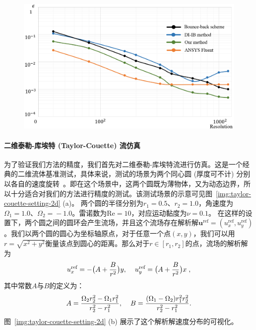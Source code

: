 \begin{figure}[!tb]
  \centering
    \includegraphics[width=0.94\columnwidth]{figures/taylor-couette-error-compare.png}
  \label{img:taylor-couette-error-compare}
\end{figure}

\paragraph{二维泰勒-库埃特 (Taylor-Couette) 流仿真}
为了验证我们方法的精度，我们首先对二维泰勒-库埃特流进行仿真。这是一个经典的二维流体基准测试，具体来说，测试的场景为两个同心圆 (厚度可不计) 分别以各自的速度旋转~\citep{xu2006immersed}。即在这个场景中，这两个圆既为薄物体，又为动态边界，所以十分适合对我们的方法进行精度的测试。该测试场景的示意可见图~\ref{img:taylor-couette-setting-2d} (a)。
两个圆的半径分别为$r_1 \!=\! 0.5$、$r_2 \!=\! 1.0$，角速度为$\Omega_1 \!=\! 1.0$、$\Omega_2 \!=\! -1.0$。雷诺数为$\text{Re} \!=\! 10$，对应运动黏度为$\nu \!=\! 0.1$。
在这样的设置下，两个圆之间的圆环会产生流场，并且这个流场存在解析解$\bm{u}^\text{ref}\!=\!(u_x^\text{ref},u_y^\text{ref})$。我们以两个圆的圆心为坐标轴原点，对于任意一个点$(x,y)$，我们可以用$r\!=\!\sqrt{x^2+y^2}$衡量该点到圆心的距离。那么对于$r\!\in\![r_1, r_2]$的点，流场的解析解为
\begin{equation}
u_x^\text{ref} = -\bigl(A + \frac{B}{r^2}\bigr)y, \hspace{4mm} u_y^\text{ref} = \bigl(A + \frac{B}{r^2}\bigr)x\;,
\end{equation}
\noindent 其中常数$A$与$B$的定义为：
\begin{equation}
A = \frac{\Omega_2 r_2^2 - \Omega_1 r_1^2}{r_2^2 - r_1^2}, \hspace{4mm} B= \frac{(\Omega_1 - \Omega_2)r_1^2r_2^2}{r_2^2 - r_1^2}.
\end{equation}
图~\ref{img:taylor-couette-setting-2d} (b) 展示了这个解析解速度分布的可视化。

